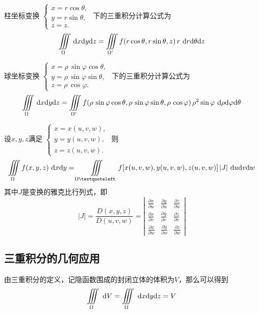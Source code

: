 \theorem[柱坐标变换]
柱坐标变换
$
\begin{cases}
	x =r \cos \theta,\\
	y = r \sin \theta ,\\
	z = z.
\end{cases}
$
下的三重积分计算公式为
\begin{equation}
	\iiint\limits_{\Omega} \,{\rm{d}} x {\rm{d}} y  {\rm{d}} z = \iiint\limits_{\Omega'} f(r\cos\theta,r\sin\theta,z)\,r \,\,{\rm{d}} r {\rm{d}} \theta  {\rm{d}} z
\end{equation}

\ttheorem[球坐标变换]
球坐标变换
$
\begin{cases}
	x =\rho \,\sin \varphi \cos \theta,\\
	y = \rho \,\sin \varphi \sin \theta ,\\
	z = \rho \,\cos \varphi .
\end{cases}
$
下的三重积分计算公式为
\begin{equation}
	\iiint\limits_{\Omega} \,{\rm{d}} x {\rm{d}} y  {\rm{d}} z = \iiint\limits_{\Omega'} f(\rho \,\sin \varphi \cos \theta,\rho \,\sin \varphi \sin \theta , \rho \,\cos \varphi)\, \rho^2 \sin \varphi \,\,{\rm{d}} \rho {\rm{d}} \varphi  {\rm{d}} \theta 
\end{equation}

\ttheorem[一般变换]
设$x,y,z$满足
$
\begin{cases}
	x = x(u,v,w),\\
	y = y(u,v,w), \\
	z = z(u,v,w).
\end{cases}
$
则
\begin{equation}
	\iiint\limits_{\Omega }f(x,y,z)\,\, \d x \d y= \iiint\limits_{\Omega‘}f[x(u,v,w),y(u,v,w),z(u,v,w)]\,|J|\, \,\d u \d v \d w
\end{equation}
其中$J$是变换的雅克比行列式，即
\renewcommand{\arraystretch}{1.5}
\begin{equation*}
	|J|=\frac{D(x,y,z)}{D(u,v,w)}=
	\left| 
	\begin{array}{ccc}
		\displaystyle \frac{\partial x}{\partial u} & \displaystyle \frac{\partial y}{\partial u} & \displaystyle \frac{\partial z}{\partial u} \\
		\displaystyle \frac{\partial x}{\partial v} & \displaystyle \frac{\partial y}{\partial v} & \displaystyle \frac{\partial z}{\partial v} \\
		\displaystyle \frac{\partial x}{\partial w} & \displaystyle \frac{\partial y}{\partial w} & \displaystyle \frac{\partial z}{\partial w} 
	\end{array}
	\right| 
\end{equation*}
\renewcommand{\arraystretch}{1}


\subsection{三重积分的几何应用}
\example[求立体的体积]
由三重积分的定义，记隐函数围成的封闭立体的体积为$V$，那么可以得到
\begin{equation}
	\iiint\limits_{\Omega} \, \, {\rm{d}} V=\iiint\limits_{\Omega}\, \, {\rm{d}} x {\rm{d}} y {\rm{d}} z=V
\end{equation}